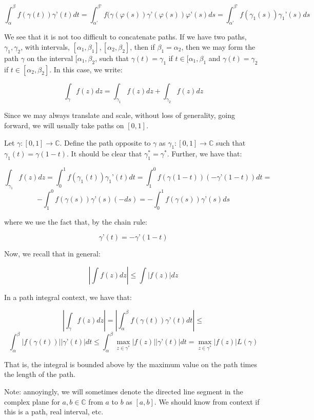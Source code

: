 \documentclass[10pt]{article}
\begin{document}
$$\int_\alpha^\beta f(\gamma(t)) \gamma’(t) dt = \int_{\alpha’}^{\beta’} f(\gamma(\varphi(s)) \gamma’(\varphi(s)) \varphi’(s) ds =  \int_{\alpha’}^{\beta’} f(\gamma_1(s)) \gamma_1’(s) ds $$

We see that it is not too difficult to concatenate paths. If we have two paths, $\gamma_1, \gamma_2$, with intervals, $[\alpha_1,\beta_1], [\alpha_2, \beta_2]$, then if $\beta_1 = \alpha_2$, then we may form the path $\gamma$ on the interval $[\alpha_1, \beta_2$, such that $\gamma(t) = \gamma_1$ if $t \in [\alpha_1, \beta_1$ and $\gamma(t) = \gamma_2$ if $t \in [\alpha_2, \beta_2]$. In this case, we write:

$$ \int_\gamma f(z) dz  = \int_{\gamma_1} f(z) dz + \int_{\gamma_2} f(z) dz $$

Since we may always translate and scale, without loss of generality, going forward, we will usually take paths on $[0,1]$. 

Let $\gamma: [0,1] \to \mathbb{C}$. Define the path opposite to $\gamma$ as $\gamma_1: [0,1] \to \mathbb{C}$ such that $\gamma_1(t) = \gamma(1-t)$. It should be clear that $\gamma_1^* = \gamma^*$. Further, we have that:

$$ \int_{\gamma_1} f(z) dz = \int_0^1 f(\gamma_1(t)) \gamma_1’(t) dt = \int_1^0 f(\gamma(1-t)) \left(-\gamma’(1-t)\right) dt =  $$
$$  - \int_1^0 f(\gamma(s)) \gamma’(s)(-ds) = - \int_0^1 f(\gamma(s)) \gamma’(s) ds $$

where we use the fact that, by the chain rule:

$$ \gamma’(t) = -\gamma’(1-t)$$

Now, we recall that in general:

$$ \left| \int f(z) dz \right| \leq \int | f(z) | dz $$

In a path integral context, we have that:

$$ \left| \int_\gamma f(z) dz \right|  = \left| \int_\alpha^\beta f(\gamma(t)) \gamma’(t) dt \right| \leq $$
$$ \int_\alpha^\beta |f(\gamma(t))| |\gamma’(t)| dt \leq \int_\alpha^\beta \max_{z \in \gamma^*} |f(z)| |\gamma’(t)| dt =  \max_{z \in \gamma^*} |f(z)| L(\gamma)  $$

That is, the integral is bounded above by the maximum value on the path times the length of the path.

Note: annoyingly, we will sometimes denote the directed line segment in the complex plane for $a,b \in \mathbb{C}$ from $a$ to $b$ as $[a,b]$. We should know from context if this is a path, real interval, etc.
\end{document}
